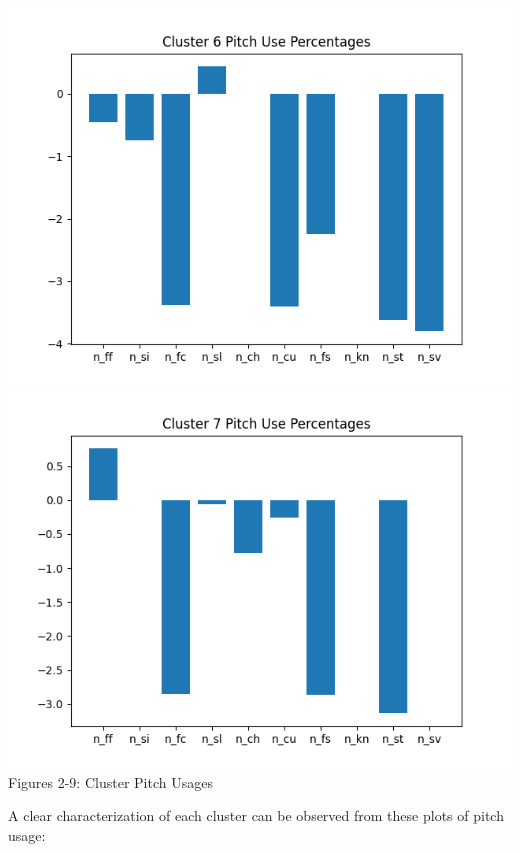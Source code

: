 \documentclass[12 pt]{article}
\begin{document}
\begin{center}
\\ \includegraphics[scale=.425]{figs/pct6_8.png} \includegraphics[scale=.425]{figs/pct7_8.png}
\\ Figures 2-9: Cluster Pitch Usages
\end{center}

\indent A clear characterization of each cluster can be observed from these plots of 
pitch usage:
\end{document}
